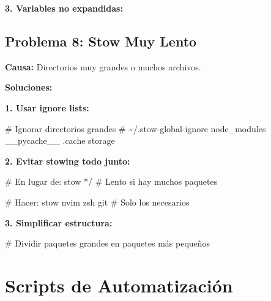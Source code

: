 \documentclass[
  doc,
  floatsintext,
  longtable,
  a4paper,
  nolmodern,
  notxfonts,
  notimes,
  12pt,
  colorlinks=true,linkcolor=blue,citecolor=blue,urlcolor=blue]{apa7}
\newenvironment{Shaded}{\begin{snugshade}}{\end{snugshade}}
\newcommand{\CommentTok}[1]{\textcolor[rgb]{0.37,0.37,0.37}{#1}}
\newcommand{\ExtensionTok}[1]{\textcolor[rgb]{0.00,0.23,0.31}{#1}}
\newcommand{\NormalTok}[1]{\textcolor[rgb]{0.00,0.23,0.31}{#1}}
\newcommand{\PreprocessorTok}[1]{\textcolor[rgb]{0.68,0.00,0.00}{#1}}
\newcommand{\VariableTok}[1]{\textcolor[rgb]{0.07,0.07,0.07}{#1}}
\begin{document}
\textbf{3. Variables no expandidas:}

\begin{Shaded}
\end{Shaded}

\subsection{Problema 8: Stow Muy Lento}\label{problema-8-stow-muy-lento}

\textbf{Causa:} Directorios muy grandes o muchos archivos.

\textbf{Soluciones:}

\textbf{1. Usar ignore lists:}

\begin{Shaded}
\begin{Highlighting}[]
\CommentTok{\# Ignorar directorios grandes}
\CommentTok{\# \textasciitilde{}/.stow{-}global{-}ignore}
\ExtensionTok{node\_modules}
\ExtensionTok{\_\_pycache\_\_}
\ExtensionTok{.cache}
\ExtensionTok{storage}
\end{Highlighting}
\end{Shaded}

\textbf{2. Evitar stowing todo junto:}

\begin{Shaded}
\begin{Highlighting}[]
\CommentTok{\# En lugar de:}
\ExtensionTok{stow} \PreprocessorTok{*}\NormalTok{/  }\CommentTok{\# Lento si hay muchos paquetes}

\CommentTok{\# Hacer:}
\ExtensionTok{stow}\NormalTok{ nvim zsh git  }\CommentTok{\# Solo los necesarios}
\end{Highlighting}
\end{Shaded}

\textbf{3. Simplificar estructura:}

\begin{Shaded}
\begin{Highlighting}[]
\CommentTok{\# Dividir paquetes grandes en paquetes más pequeños}
\end{Highlighting}
\end{Shaded}

\section{Scripts de Automatización}\label{scripts-de-automatizaciuxf3n}
\end{document}
